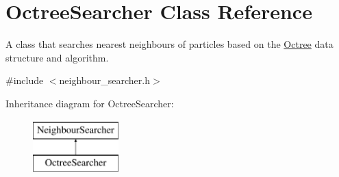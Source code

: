 \hypertarget{classOctreeSearcher}{\section{Octree\-Searcher Class Reference}
\label{classOctreeSearcher}
}


A class that searches nearest neighbours of particles based on the \hyperlink{classOctree}{Octree} data structure and algorithm.  




{\ttfamily \#include $<$neighbour\-\_\-searcher.\-h$>$}

Inheritance diagram for Octree\-Searcher\-:\begin{figure}[H]
\begin{center}
\leavevmode
\includegraphics[height=2.000000cm]{classOctreeSearcher}
\end{center}
\end{figure}
